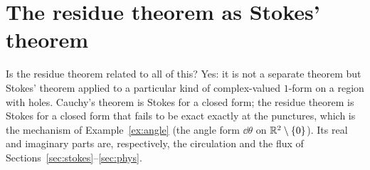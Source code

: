\section{The residue theorem as Stokes' theorem}\label{sec:complex}

Is the residue theorem related to all of this? Yes: it is not a separate theorem but Stokes' theorem applied to a particular kind of complex-valued $1$-form on a region with holes.
Cauchy's theorem is Stokes for a closed form; the residue theorem is Stokes for a closed form that fails to be exact exactly at the punctures, which is the mechanism of Example~\ref{ex:angle}
(the angle form $\dd\theta$ on $\mathbb{R}^2\setminus\{0\}$). Its real and imaginary parts are, respectively, the circulation and the flux of Sections~\ref{sec:stokes}--\ref{sec:phys}.








